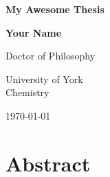 



 
\begin{titlepage}
    \begin{center}
        \vspace*{1cm}

        \huge \textbf{My Awesome Thesis}\\%

        \vspace{1.5cm}

        \LARGE \textbf{Your Name}%
       
        \vspace{1cm}
        
        \Large

        Doctor of Philosophy

        \vspace{1cm}

        University of York \\
        Chemistry

        \vfill

        \large
       
        \monthyeardate\today
            
   \end{center}
\end{titlepage}

\newpage

\pagestyle{plain}

\section{Abstract}


\newpage

